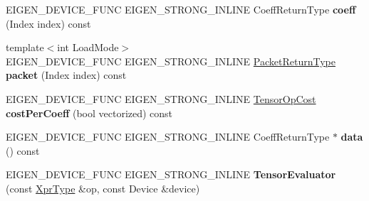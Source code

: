\begin{DoxyCompactItemize}
E\+I\+G\+E\+N\+\_\+\+D\+E\+V\+I\+C\+E\+\_\+\+F\+U\+NC E\+I\+G\+E\+N\+\_\+\+S\+T\+R\+O\+N\+G\+\_\+\+I\+N\+L\+I\+NE Coeff\+Return\+Type {\bfseries coeff} (Index index) const
\item 
\mbox{\label{struct_eigen_1_1_tensor_evaluator_3_01const_01_tensor_chipping_op_3_01_dim_id_00_01_arg_type_01_4_00_01_device_01_4_a00701bf82e76279d03dd35dea48cadd8}} 
{\footnotesize template$<$int Load\+Mode$>$ }\\E\+I\+G\+E\+N\+\_\+\+D\+E\+V\+I\+C\+E\+\_\+\+F\+U\+NC E\+I\+G\+E\+N\+\_\+\+S\+T\+R\+O\+N\+G\+\_\+\+I\+N\+L\+I\+NE \hyperlink{group___sparse_core___module}{Packet\+Return\+Type} {\bfseries packet} (Index index) const
\item 
\mbox{\label{struct_eigen_1_1_tensor_evaluator_3_01const_01_tensor_chipping_op_3_01_dim_id_00_01_arg_type_01_4_00_01_device_01_4_a702680a8fd84b5ce6d7f700e0fe26652}} 
E\+I\+G\+E\+N\+\_\+\+D\+E\+V\+I\+C\+E\+\_\+\+F\+U\+NC E\+I\+G\+E\+N\+\_\+\+S\+T\+R\+O\+N\+G\+\_\+\+I\+N\+L\+I\+NE \hyperlink{class_eigen_1_1_tensor_op_cost}{Tensor\+Op\+Cost} {\bfseries cost\+Per\+Coeff} (bool vectorized) const
\item 
\mbox{\label{struct_eigen_1_1_tensor_evaluator_3_01const_01_tensor_chipping_op_3_01_dim_id_00_01_arg_type_01_4_00_01_device_01_4_a778fcc336b9cebf28f69fd832d894fd1}} 
E\+I\+G\+E\+N\+\_\+\+D\+E\+V\+I\+C\+E\+\_\+\+F\+U\+NC E\+I\+G\+E\+N\+\_\+\+S\+T\+R\+O\+N\+G\+\_\+\+I\+N\+L\+I\+NE Coeff\+Return\+Type $\ast$ {\bfseries data} () const
\item 
\mbox{\label{struct_eigen_1_1_tensor_evaluator_3_01const_01_tensor_chipping_op_3_01_dim_id_00_01_arg_type_01_4_00_01_device_01_4_a321a28a1599cf5013409111e715df64b}} 
E\+I\+G\+E\+N\+\_\+\+D\+E\+V\+I\+C\+E\+\_\+\+F\+U\+NC E\+I\+G\+E\+N\+\_\+\+S\+T\+R\+O\+N\+G\+\_\+\+I\+N\+L\+I\+NE {\bfseries Tensor\+Evaluator} (const \hyperlink{class_eigen_1_1_tensor_chipping_op}{Xpr\+Type} \&op, const Device \&device)

\end{DoxyCompactItemize}
